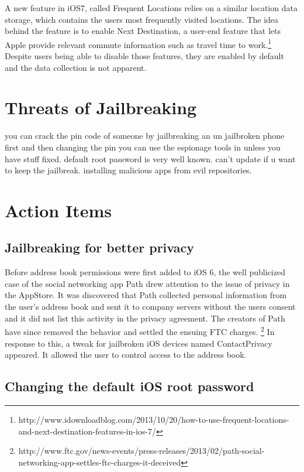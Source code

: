 \documentclass[12pt, titlepage, oneside]{article}
\begin{document}
A new feature in iOS7, called Frequent Locations relies on a similar location data storage, which contains the users most frequently visited locations. The idea behind the feature is to enable Next Destination, a user-end feature that lets Apple provide relevant commute information such as travel time to work.\footnote{http://www.idownloadblog.com/2013/10/20/how-to-use-frequent-locations-and-next-destination-features-in-ios-7/} Despite users being able to disable those features, they are enabled by default and the data collection is not apparent.

\section{Threats of Jailbreaking}

you can crack the pin code of someone by jailbreaking an un jailbroken phone first and then changing the pin
you can use the espionage tools in \cite{espionage} unless you have stuff fixed.
default root password is very well known.
can't update if u want to keep the jailbreak.
installing malicious apps from evil repositories.

\section{Action Items}
\subsection{Jailbreaking for better privacy}

Before address book permissions were first added to iOS 6, the well publicized case of the social networking app Path drew attention to the issue of privacy in the AppStore. It was discovered that Path collected personal information from the user's address book and sent it to company servers without the users consent and it did not list this activity in the privacy agreement. The creators of Path have since removed the behavior and settled the ensuing FTC charges. \footnote{http://www.ftc.gov/news-events/press-releases/2013/02/path-social-networking-app-settles-ftc-charges-it-deceived} In response to this, a tweak for jailbroken iOS devices named ContactPrivacy appeared. It allowed the user to control access to the address book.

\subsection{Changing the default iOS root password}
\end{document}
